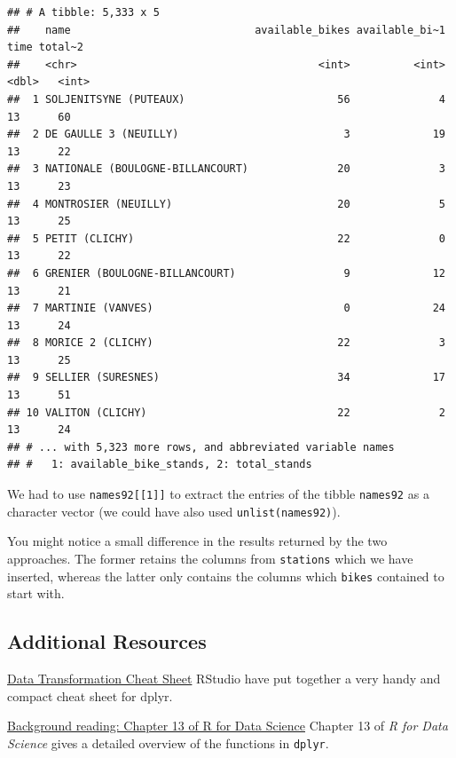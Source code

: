 \documentclass[
]{book}
\begin{document}
\begin{verbatim}
## # A tibble: 5,333 x 5
##    name                             available_bikes available_bi~1  time total~2
##    <chr>                                      <int>          <int> <dbl>   <int>
##  1 SOLJENITSYNE (PUTEAUX)                        56              4    13      60
##  2 DE GAULLE 3 (NEUILLY)                          3             19    13      22
##  3 NATIONALE (BOULOGNE-BILLANCOURT)              20              3    13      23
##  4 MONTROSIER (NEUILLY)                          20              5    13      25
##  5 PETIT (CLICHY)                                22              0    13      22
##  6 GRENIER (BOULOGNE-BILLANCOURT)                 9             12    13      21
##  7 MARTINIE (VANVES)                              0             24    13      24
##  8 MORICE 2 (CLICHY)                             22              3    13      25
##  9 SELLIER (SURESNES)                            34             17    13      51
## 10 VALITON (CLICHY)                              22              2    13      24
## # ... with 5,323 more rows, and abbreviated variable names
## #   1: available_bike_stands, 2: total_stands
\end{verbatim}

We had to use \texttt{names92{[}{[}1{]}{]}} to extract the entries of the tibble \texttt{names92} as a character vector (we could have also used \texttt{unlist(names92)}).

You might notice a small difference in the results returned by the two approaches. The former retains the columns from \texttt{stations} which we have inserted, whereas the latter only contains the columns which \texttt{bikes} contained to start with.

\hypertarget{additional-resources-2}{%
\subsection{Additional Resources}\label{additional-resources-2}}

\href{\%22https://www.rstudio.com/wp-content/uploads/2015/02/data-wrangling-cheatsheet.pdf\%22}{Data Transformation Cheat Sheet}
RStudio have put together a very handy and compact cheat sheet for dplyr.

\href{\%22http://r4ds.had.co.nz/relational-data.html\%22}{Background reading: Chapter 13 of R for Data Science}
Chapter 13 of \emph{R for Data Science} gives a detailed overview of the functions in \texttt{dplyr}.
\end{document}
